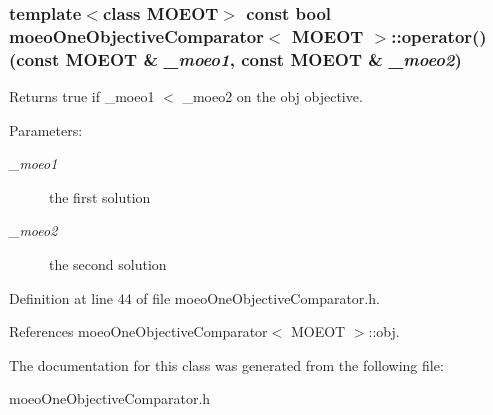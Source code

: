 \subsubsection{\setlength{\rightskip}{0pt plus 5cm}template$<$class MOEOT$>$ const bool \bf{moeo\-One\-Objective\-Comparator}$<$ MOEOT $>$::operator() (const MOEOT \& {\em \_\-moeo1}, const MOEOT \& {\em \_\-moeo2})\hspace{0.3cm}{\tt  [inline]}}\label{classmoeoOneObjectiveComparator_962a4cbc308c30a83c9c485a79374f6a}


Returns true if \_\-moeo1 $<$ \_\-moeo2 on the obj objective. 

\begin{Desc}
\item[Parameters:]
\begin{description}
\item[{\em \_\-moeo1}]the first solution \item[{\em \_\-moeo2}]the second solution \end{description}
\end{Desc}


Definition at line 44 of file moeo\-One\-Objective\-Comparator.h.

References moeo\-One\-Objective\-Comparator$<$ MOEOT $>$::obj.

The documentation for this class was generated from the following file:\begin{CompactItemize}
\item 
moeo\-One\-Objective\-Comparator.h\end{CompactItemize}
